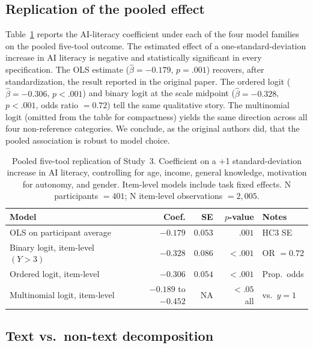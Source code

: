 \documentclass[11pt]{article}
\begin{document}
\subsection{Replication of the pooled effect}

Table~\ref{tab:pooled} reports the AI-literacy coefficient under each of the
four model families on the pooled five-tool outcome. The estimated effect of a
one-standard-deviation increase in AI literacy is negative and statistically
significant in every specification. The OLS estimate
($\hat\beta = -0.179$, $p = .001$) recovers, after standardization, the result
reported in the original paper. The ordered logit ($\hat\beta = -0.306$,
$p < .001$) and binary logit at the scale midpoint
($\hat\beta = -0.328$, $p < .001$, odds ratio $= 0.72$) tell the same
qualitative story. The multinomial logit (omitted from the table for
compactness) yields the same direction across all four non-reference
categories. We conclude, as the original authors did, that the pooled
association is robust to model choice.

\begin{table}[t]
  \centering
  \caption{Pooled five-tool replication of Study~3. Coefficient on a
    +1 standard-deviation increase in AI literacy, controlling for age,
    income, general knowledge, motivation for autonomy, and gender. Item-level
    models include task fixed effects.
    N participants $= 401$; N item-level observations $= 2{,}005$.}
  \label{tab:pooled}
  \begin{tabular}{lrrrl}
    \toprule
    \textbf{Model} & \textbf{Coef.} & \textbf{SE} & \textbf{$p$-value} & \textbf{Notes} \\
    \midrule
    OLS on participant average           & $-0.179$ & $0.053$ & $.001$    & HC3 SE   \\
    Binary logit, item-level $(Y > 3)$   & $-0.328$ & $0.086$ & $< .001$  & OR $= 0.72$ \\
    Ordered logit, item-level            & $-0.306$ & $0.054$ & $< .001$  & Prop.\ odds \\
    Multinomial logit, item-level        & $-0.189$ to $-0.452$ & NA & $< .05$ all & vs.\ $y=1$ \\
    \bottomrule
  \end{tabular}
\end{table}

\subsection{Text vs.\ non-text decomposition}
\end{document}
